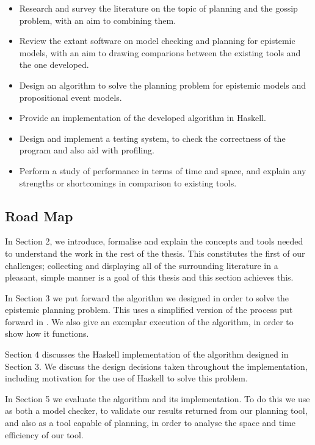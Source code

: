 \documentclass[12pt, a4paper]{article}
\begin{document}
\begin{itemize}
  \item Research and survey the literature on the topic of planning and the
    gossip problem, with an aim to combining them.
  \item Review the extant software on model checking and planning for epistemic
    models, with an aim to drawing comparions between the existing tools and the
    one developed. 
  \item Design an algorithm to solve the planning problem for epistemic models
    and propositional event models.
  \item Provide an implementation of the developed algorithm in Haskell.
  \item Design and implement a testing system, to check the correctness of the
    program and also aid with profiling.
  \item Perform a study of performance in terms of time and space, and explain
    any strengths or shortcomings in comparison to existing tools. 
\end{itemize}


\subsection{Road Map}

In Section 2, we introduce, formalise and explain the concepts and tools needed
to understand the work in the rest of the thesis. This constitutes the first of
our challenges; collecting and displaying all of the surrounding literature in a
pleasant, simple manner is a goal of this thesis and this section achieves this.

In Section 3 we put forward the algorithm we designed in order to solve the
epistemic planning problem. This uses a simplified version of the process put
forward in . We also give an exemplar execution of
the algorithm, in order to show how it functions.

Section 4 discusses the Haskell implementation of the algorithm designed in
Section 3. We discuss the design decisions taken throughout the implementation,
including motivation for the use of Haskell to solve this problem.

In Section 5 we evaluate the algorithm and its implementation. To do this we
use \cite{GithubGossip} as both a model checker, to validate our results
returned from our planning tool, and also as a tool capable of planning, in
order to analyse the space and time efficiency of our tool. 
\end{document}
